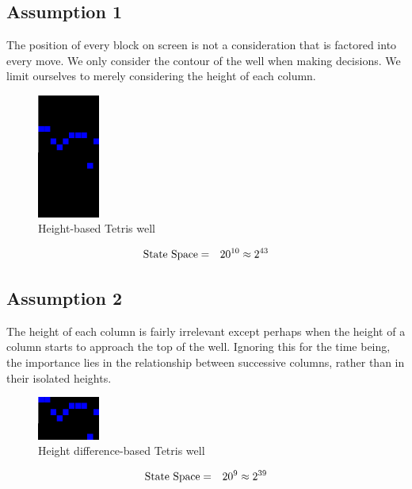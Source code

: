\documentclass{rucsthesis}
\begin{document}
\subsection*{Assumption 1}

The position of every block on screen is not a consideration that is factored into every move. We only consider the contour of the well when making decisions. We limit ourselves to merely considering the height of each column.

\begin{figure}[h]
\centering
\includegraphics[width=0.8in]{heightwell.png}
\caption{Height-based Tetris well}
\label{fig:heightwell}
\end{figure}

\begin{eqnarray*}
\centering
\textrm{State Space} & = & 20^{10} \approx 2^{43}
\end{eqnarray*}

\subsection*{Assumption 2}

The height of each column is fairly irrelevant except perhaps when the height of a column starts to approach the top of the well. Ignoring this for the time being, the importance lies in the relationship between successive columns, rather than in their isolated heights.

\begin{figure}[h]
\centering
\includegraphics[width=0.8in]{diffheightwell.png}
\caption{Height difference-based Tetris well}
\label{fig:diffheightwell}
\end{figure}

\begin{eqnarray*}
\centering
\textrm{State Space} & = & 20^{9} \approx 2^{39}
\end{eqnarray*}
\end{document}
